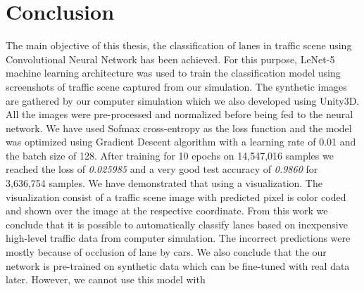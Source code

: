 \par
\section{Conclusion}
The main objective of this thesis, the classification of lanes in traffic scene using Convolutional Neural Network has been achieved. For this purpose, LeNet-5 machine learning architecture was used to train the classification model using screenshots of traffic scene captured from our simulation. The synthetic images are gathered by our computer simulation which we also developed using Unity3D. All the images were pre-processed and normalized before being fed to the neural network. We have used Sofmax cross-entropy as the loss function and the model was optimized using Gradient Descent algorithm with a learning rate of 0.01 and the batch size of 128. After training for 10 epochs on 14,547,016 samples we reached the loss of \textit{0.025985} and a very good test accuracy of \textit{0.9860} for 3,636,754 samples.
We have demonstrated that using a visualization. The visualization consist of a traffic scene image with predicted pixel is color coded and shown over the image at the respective coordinate. From this work we conclude that it is possible to automatically classify lanes based on inexpensive high-level traffic data from computer simulation. The incorrect predictions were mostly because of occlusion of lane by cars. We also conclude that the our network is pre-trained on synthetic data which can be fine-tuned with real data later. However, we cannot use this model with 

